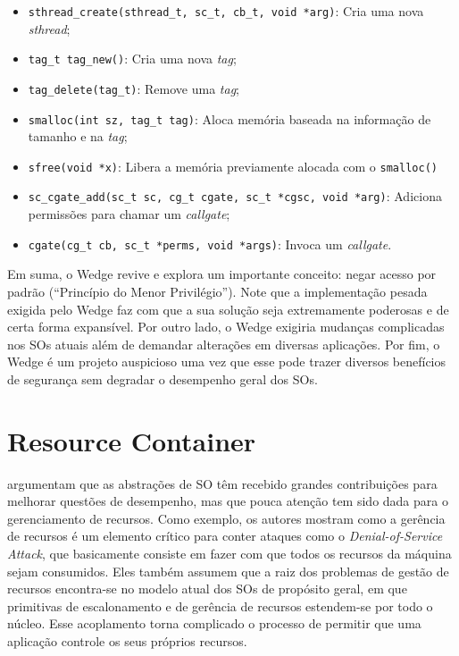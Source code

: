 \begin{itemize}
  \item \texttt{sthread\_create(sthread\_t, sc\_t, cb\_t, void *arg)}: Cria
uma nova \emph{sthread};
  \item \texttt{tag\_t tag\_new()}: Cria uma nova \emph{tag};
  \item \texttt{tag\_delete(tag\_t)}: Remove uma \emph{tag};
  \item \texttt{smalloc(int sz, tag\_t tag)}: Aloca memória baseada na
informação de tamanho e na \emph{tag};
  \item \texttt{sfree(void *x)}: Libera a memória previamente alocada com o
\texttt{smalloc()}
  \item \texttt{sc\_cgate\_add(sc\_t sc, cg\_t cgate, sc\_t *cgsc, void *arg)}:
Adiciona permissões para chamar um \emph{callgate};
  \item \texttt{cgate(cg\_t cb, sc\_t *perms, void *args)}: Invoca um
\emph{callgate}.
\end{itemize}

Em suma, o Wedge revive e explora um importante conceito: negar acesso por
padrão (``Princípio do Menor Privilégio''). Note que a implementação pesada
exigida pelo Wedge faz com que a sua solução seja extremamente poderosas e de
certa forma expansível. Por outro lado, o Wedge exigiria mudanças complicadas
nos SOs atuais além de demandar alterações em diversas aplicações. Por fim, o
Wedge é um projeto auspicioso uma vez que esse pode trazer diversos benefícios
de segurança sem degradar o desempenho geral dos SOs. 

\section{Resource Container}
\label{sec:rc}

\citet{resourcecontainers} argumentam que as abstrações de SO têm recebido
grandes contribuições para melhorar questões de desempenho, mas que
pouca atenção tem sido dada para o gerenciamento de recursos. Como exemplo, os
autores mostram como a gerência de recursos é um elemento crítico para conter
ataques como o \emph{Denial-of-Service Attack}, que basicamente consiste em fazer
com que todos os recursos da máquina sejam consumidos. Eles também
assumem que a raiz dos problemas de gestão de
recursos encontra-se no modelo atual dos SOs de propósito geral, em
que primitivas de escalonamento e de gerência de recursos estendem-se por todo
o núcleo. Esse acoplamento torna complicado o processo de permitir que uma
aplicação controle os seus próprios recursos.

